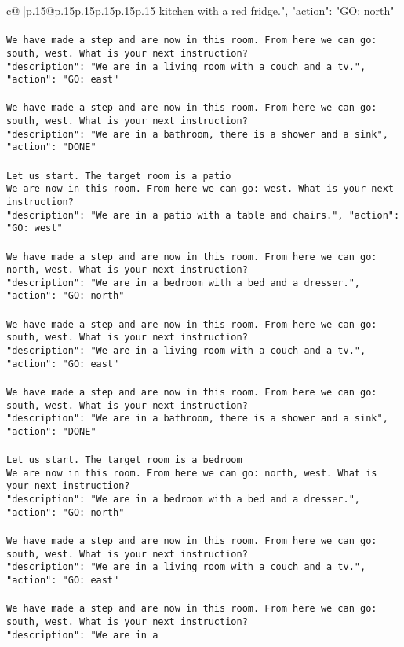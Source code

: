 \documentclass{article}
\begin{document}
{\begin{supertabular}{c@{$\;$}|p{.15\linewidth}@{}p{.15\linewidth}p{.15\linewidth}p{.15\linewidth}p{.15\linewidth}p{.15\linewidth}}
{{{kitchen with a red fridge.", "action": "GO: north"}\\ \tt \\ \tt We have made a step and are now in this room. From here we can go: south, west. What is your next instruction?\\ \tt {"description": "We are in a living room with a couch and a tv.", "action": "GO: east"}\\ \tt \\ \tt We have made a step and are now in this room. From here we can go: south, west. What is your next instruction?\\ \tt {"description": "We are in a bathroom, there is a shower and a sink", "action": "DONE"}\\ \tt \\ \tt Let us start. The target room is a patio\\ \tt We are now in this room. From here we can go: west. What is your next instruction?\\ \tt {"description": "We are in a patio with a table and chairs.", "action": "GO: west"}\\ \tt \\ \tt We have made a step and are now in this room. From here we can go: north, west. What is your next instruction?\\ \tt {"description": "We are in a bedroom with a bed and a dresser.", "action": "GO: north"}\\ \tt \\ \tt We have made a step and are now in this room. From here we can go: south, west. What is your next instruction?\\ \tt {"description": "We are in a living room with a couch and a tv.", "action": "GO: east"}\\ \tt \\ \tt We have made a step and are now in this room. From here we can go: south, west. What is your next instruction?\\ \tt {"description": "We are in a bathroom, there is a shower and a sink", "action": "DONE"}\\ \tt \\ \tt Let us start. The target room is a bedroom\\ \tt We are now in this room. From here we can go: north, west. What is your next instruction?\\ \tt {"description": "We are in a bedroom with a bed and a dresser.", "action": "GO: north"}\\ \tt \\ \tt We have made a step and are now in this room. From here we can go: south, west. What is your next instruction?\\ \tt {"description": "We are in a living room with a couch and a tv.", "action": "GO: east"}\\ \tt \\ \tt We have made a step and are now in this room. From here we can go: south, west. What is your next instruction?\\ \tt {"description": "We are in a }}}
\end{supertabular}}
\end{document}
